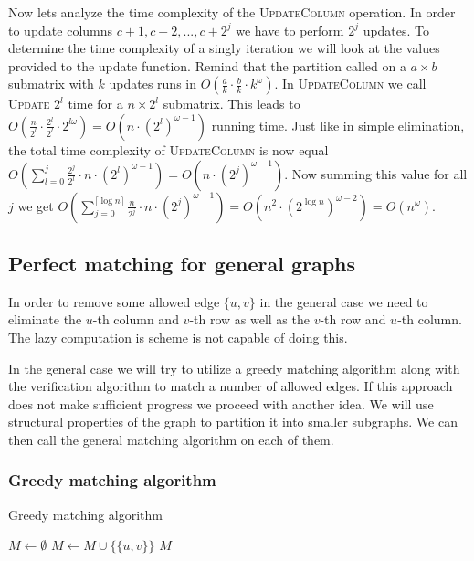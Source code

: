 Now lets analyze the time complexity of the \textsc{UpdateColumn} operation.
In order to update columns $c+1,c+2,...,c+2^j$ we have to perform $2^j$ updates.
To determine the time complexity of a singly iteration we will look at the values provided to the update function.
Remind that the partition called on a $a \times b$ submatrix with $k$ updates runs in $O(\frac{a}{k}\cdot\frac{b}{k}\cdot k^\omega)$.
In \textsc{UpdateColumn} we call \textsc{Update} $2^l$ time for a $n \times 2^l$ submatrix.
This leads to $O(\frac{n}{2^l}\cdot\frac{2^l}{2^l}\cdot 2^{l\omega}) = O(n\cdot(2^l)^{\omega-1})$ running time.
Just like in simple elimination, the total time complexity of \textsc{UpdateColumn} is now equal $O(\sum_{l=0}^{j} \frac{2^j}{2^l}\cdot n\cdot(2^l)^{\omega-1}) = O(n\cdot(2^j)^{\omega-1})$.
Now summing this value for all $j$ we get $O(\sum_{j=0}^{\lceil\log{n}\rceil} \frac{n}{2^j}\cdot n\cdot(2^j)^{\omega-1}) = O(n^2\cdot(2^{\log{n}})^{\omega-2}) = O(n^\omega)$.

\subsection{Perfect matching for general graphs}
In order to remove some allowed edge $\{u,v\}$ in the general case we need to eliminate the $u$-th column and $v$-th row as well as the $v$-th row and $u$-th column.
The lazy computation is scheme is not capable of doing this.

In the general case we will try to utilize a greedy matching algorithm along with the verification algorithm to match a number of allowed edges.
If this approach does not make sufficient progress we proceed with another idea.
We will use structural properties of the graph to partition it into smaller subgraphs.
We can then call the general matching algorithm on each of them.

\subsubsection{Greedy matching algorithm}
\begin{algorithm}\label{greedy_matching}
\caption{Greedy matching algorithm}
\begin{algorithmic}[1]
\State $M \gets \emptyset$
        \State $M \gets M \cup \{\{u,v\}\}$
    \EndIf
\EndFor
\State \Return $M$
\EndFunction
\end{algorithmic}
\end{algorithm}


